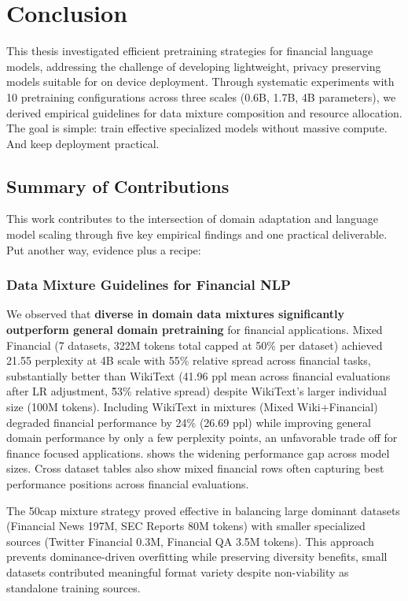 \chapter{Conclusion}

This thesis investigated efficient pretraining strategies for financial language models, addressing the challenge of developing lightweight, privacy preserving models suitable for on device deployment. Through systematic experiments with 10 pretraining configurations across three scales (0.6B, 1.7B, 4B parameters), we derived empirical guidelines for data mixture composition and resource allocation. The goal is simple: train effective specialized models without massive compute. And keep deployment practical.

\section{Summary of Contributions}

This work contributes to the intersection of domain adaptation and language model scaling through five key empirical findings and one practical deliverable. Put another way, evidence plus a recipe:

\subsection{Data Mixture Guidelines for Financial NLP}

We observed that \textbf{diverse in domain data mixtures significantly outperform general domain pretraining} for financial applications. Mixed Financial (7 datasets, 322M tokens total capped at 50\% per dataset) achieved 21.55 perplexity at 4B scale with 55\% relative spread across financial tasks, substantially better than WikiText (41.96 ppl mean across financial evaluations after LR adjustment, \~53\% relative spread) despite WikiText's larger individual size (100M tokens). Including WikiText in mixtures (Mixed Wiki+Financial) degraded financial performance by 24\% (26.69 ppl) while improving general domain performance by only a few perplexity points, an unfavorable trade off for finance focused applications.  shows the widening performance gap across model sizes. Cross dataset tables also show mixed financial rows often capturing best performance positions across financial evaluations.

The 50cap mixture strategy proved effective in balancing large dominant datasets (Financial News 197M, SEC Reports 80M tokens) with smaller specialized sources (Twitter Financial 0.3M, Financial QA 3.5M tokens). This approach prevents dominance-driven overfitting while preserving diversity benefits, small datasets contributed meaningful format variety despite non-viability as standalone training sources.

